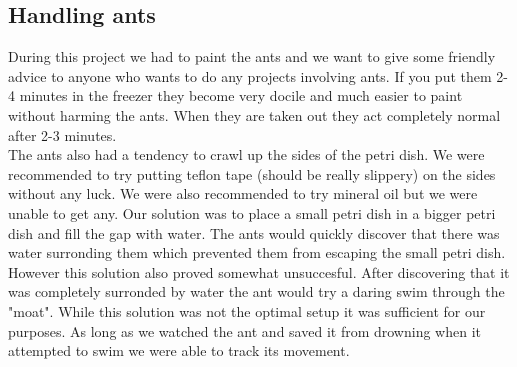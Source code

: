 
\subsection{Handling ants}
\label{ants}

During this project we had to paint the ants and we want to give some friendly advice to anyone who wants to do any projects involving ants. If you put them 2-4 minutes in the freezer they become very docile and much easier to paint without harming the ants. When they are taken out they act completely normal after 2-3 minutes. \\

The ants also had a tendency to crawl up the sides of the petri dish. We were recommended to try putting teflon tape (should be really slippery) on the sides without any luck. We were also recommended to try mineral oil but we were unable to get any. Our solution was to place a small petri dish in a bigger petri dish and fill the gap with water. The ants would quickly discover that there was water surronding them which prevented them from escaping the small petri dish. However this solution also proved somewhat unsuccesful. After discovering that it was completely surronded by water the ant would try a daring swim through the "moat". While this solution was not the optimal setup it was sufficient for our purposes. As long as we watched the ant and saved it from drowning when it attempted to swim we were able to track its movement.
 